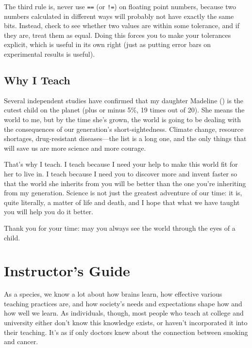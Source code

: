 \documentclass{book}
\begin{document}
The third rule is, never use \texttt{==} (or \texttt{!=}) on floating
point numbers, because two numbers calculated in different ways will
probably not have exactly the same bits. Instead, check to see whether
two values are within some tolerance, and if they are, treat them as
equal. Doing this forces you to make your tolerances explicit, which is
useful in its own right (just as putting error bars on experimental
results is useful).

\section{Why I Teach}


Several independent studies have confirmed that my daughter Madeline
() is the cutest child on the planet (plus or
minus 5\%, 19 times out of 20). She means the world to me, but by the
time she's grown, the world is going to be dealing with the
consequences of our generation's short-sightedness.  Climate change,
resource shortages, drug-resistant diseases---the list is a long one,
and the only things that will save us are more science and more
courage.

That's why I teach. I teach because I need your help to make this world
fit for her to live in. I teach because I need you to discover more and
invent faster so that the world she inherits from you will be better
than the one you're inheriting from my generation. Science is not just
the greatest adventure of our time: it is, quite literally, a matter of
life and death, and I hope that what we have taught you will help you do
it better.

Thank you for your time: may you always see the world through the eyes
of a child.

\chapter{Instructor's Guide}\label{s:instructors}

As a species, we know a lot about how brains learn, how effective
various teaching practices are, and how society's needs and expectations
shape how and how well we learn. As individuals, though, most people who
teach at college and university either don't know this knowledge exists,
or haven't incorporated it into their teaching. It's as if only doctors
knew about the connection between smoking and cancer.
\end{document}
